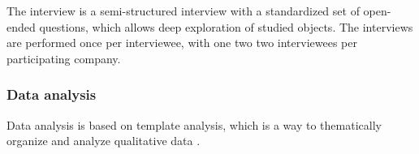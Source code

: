 The interview is a semi-structured interview with a standardized set of open-ended questions, which allows deep exploration of studied objects. The interviews are performed once per interviewee, with one two two interviewees per participating company.

\subsubsection{Data analysis}

Data analysis is based on template analysis, which is a way to thematically organize and analyze qualitative data \cite{king1998template}. 


